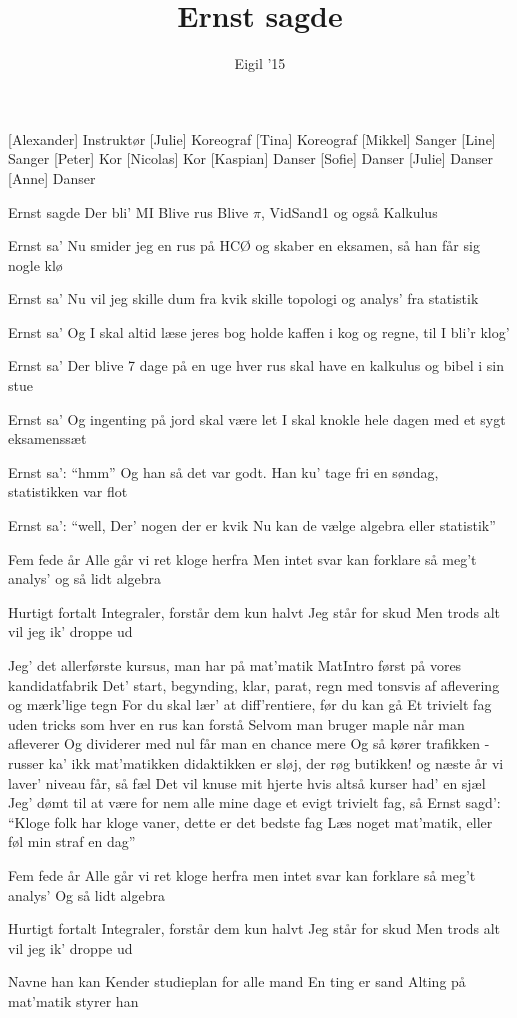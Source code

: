 \documentclass[a4paper,11pt]{article}
\title{Ernst sagde}
\author{Eigil '15}
\begin{document}
\maketitle

\begin{roles}
[Alexander] Instruktør
[Julie] Koreograf
[Tina] Koreograf
[Mikkel] Sanger
[Line]	Sanger
[Peter]	Kor
[Nicolas]	Kor
[Kaspian] Danser
[Sofie]	Danser
[Julie]	Danser
[Anne]	Danser

\end{roles}

\begin{song}
Ernst sagde
Der bli' MI
Blive rus
Blive $\pi$, VidSand1 og også Kalkulus

 Ernst sa'
Nu smider jeg en rus på HCØ
og skaber en eksamen, så han får sig nogle klø

Ernst sa'
Nu vil jeg skille dum fra kvik
skille topologi og analys' fra statistik

Ernst sa'
Og I skal altid læse jeres bog
holde kaffen i kog
og regne, til I bli'r klog'

Ernst sa'
Der blive 7 dage på en uge
hver rus skal have en kalkulus og bibel i sin stue

Ernst sa'
Og ingenting på jord skal være let
I skal knokle hele dagen med et sygt eksamenssæt

Ernst sa': ``hmm''
Og han så det var godt.
Han ku' tage fri en søndag, statistikken var flot

Ernst sa': ``well,
Der' nogen der er kvik
Nu kan de vælge algebra eller statistik''

Fem fede år
Alle går vi ret kloge herfra
Men intet svar
kan forklare så meg't analys'
og så lidt algebra

Hurtigt fortalt
Integraler, forstår dem kun halvt
Jeg står for skud
Men trods alt vil jeg ik' droppe ud

 Jeg' det allerførste kursus, man har på mat'matik
MatIntro først på vores kandidatfabrik
Det' start, begynding, klar, parat, regn
med tonsvis af aflevering og mærk'lige tegn
For du skal lær' at diff'rentiere, før du kan gå
Et trivielt fag uden tricks som hver en rus kan forstå
Selvom man bruger maple når man afleverer
Og dividerer med nul får man en chance mere
Og så kører trafikken - russer ka' ikk mat'matikken
didaktikken er sløj, der røg butikken!
og næste år vi laver' niveau får, så fæl
Det vil knuse mit hjerte hvis altså kurser had' en sjæl
Jeg' dømt til at være for nem alle mine dage
et evigt trivielt fag, så Ernst sagd':
``Kloge folk har kloge vaner, dette er det bedste fag
Læs noget mat'matik, eller føl min straf en dag''

Fem fede år
Alle går vi ret kloge herfra
men intet svar
kan forklare så meg't analys'
Og så lidt algebra

Hurtigt fortalt
Integraler, forstår dem kun halvt
Jeg står for skud
Men trods alt vil jeg ik' droppe ud

Navne han kan
Kender studieplan for alle mand
En ting er sand
Alting på mat'matik styrer han
\end{song}
\end{document}
